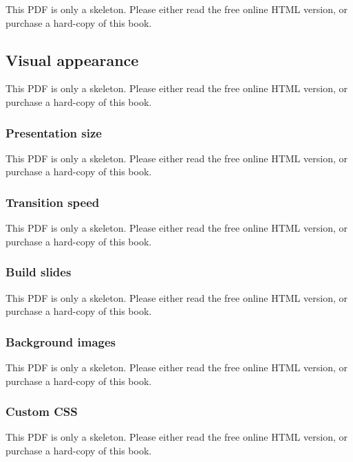\documentclass[
  11pt,
]{krantz}
\theoremstyle{definition}
\theoremstyle{definition}
\theoremstyle{definition}
\theoremstyle{definition}
\theoremstyle{remark}
\begin{document}
This PDF is only a skeleton. Please either read the free online HTML version, or purchase a hard-copy of this book.

\subsection{Visual appearance}\label{visual-appearance}

This PDF is only a skeleton. Please either read the free online HTML version, or purchase a hard-copy of this book.

\subsubsection{Presentation size}\label{presentation-size}

This PDF is only a skeleton. Please either read the free online HTML version, or purchase a hard-copy of this book.

\subsubsection{Transition speed}\label{transition-speed}

This PDF is only a skeleton. Please either read the free online HTML version, or purchase a hard-copy of this book.

\subsubsection{Build slides}\label{build-slides}

This PDF is only a skeleton. Please either read the free online HTML version, or purchase a hard-copy of this book.

\subsubsection{Background images}\label{background-images}

This PDF is only a skeleton. Please either read the free online HTML version, or purchase a hard-copy of this book.

\subsubsection{Custom CSS}\label{custom-css-ioslides}

This PDF is only a skeleton. Please either read the free online HTML version, or purchase a hard-copy of this book.
\end{document}
